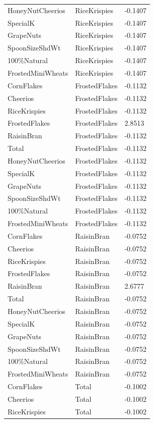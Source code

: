\begin{table}[!htbp]
\begin{tabular}{lll}
\\
HoneyNutCheerios & RiceKrispies & -0.1407
\\
SpecialK & RiceKrispies & -0.1407
\\
GrapeNuts & RiceKrispies & -0.1407
\\
SpoonSizeShdWt & RiceKrispies & -0.1407
\\
100\%Natural & RiceKrispies & -0.1407
\\
FrostedMiniWheats & RiceKrispies & -0.1407
\\
CornFlakes & FrostedFlakes & -0.1132
\\
Cheerios & FrostedFlakes & -0.1132
\\
RiceKrispies & FrostedFlakes & -0.1132
\\
FrostedFlakes & FrostedFlakes & 2.8513
\\
RaisinBran & FrostedFlakes & -0.1132
\\
Total & FrostedFlakes & -0.1132
\\
HoneyNutCheerios & FrostedFlakes & -0.1132
\\
SpecialK & FrostedFlakes & -0.1132
\\
GrapeNuts & FrostedFlakes & -0.1132
\\
SpoonSizeShdWt & FrostedFlakes & -0.1132
\\
100\%Natural & FrostedFlakes & -0.1132
\\
FrostedMiniWheats & FrostedFlakes & -0.1132
\\
CornFlakes & RaisinBran & -0.0752
\\
Cheerios & RaisinBran & -0.0752
\\
RiceKrispies & RaisinBran & -0.0752
\\
FrostedFlakes & RaisinBran & -0.0752
\\
RaisinBran & RaisinBran & 2.6777
\\
Total & RaisinBran & -0.0752
\\
HoneyNutCheerios & RaisinBran & -0.0752
\\
SpecialK & RaisinBran & -0.0752
\\
GrapeNuts & RaisinBran & -0.0752
\\
SpoonSizeShdWt & RaisinBran & -0.0752
\\
100\%Natural & RaisinBran & -0.0752
\\
FrostedMiniWheats & RaisinBran & -0.0752
\\
CornFlakes & Total & -0.1002
\\
Cheerios & Total & -0.1002
\\
RiceKrispies & Total & -0.1002

\end{tabular}
\end{table}
